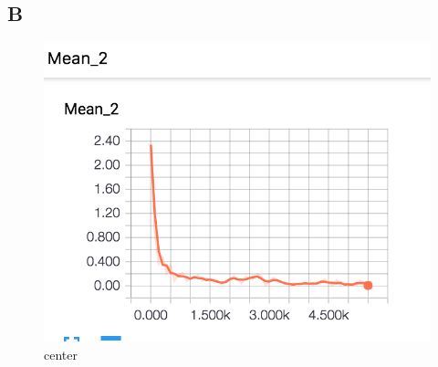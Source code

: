 \documentclass[12pt]{article}
\begin{document}
\subsection{B}
\begin{figure}[H]
  \caption{center}
  \centering
    \includegraphics[scale=0.3]{bmean.png}
\end{figure}
\end{document}
